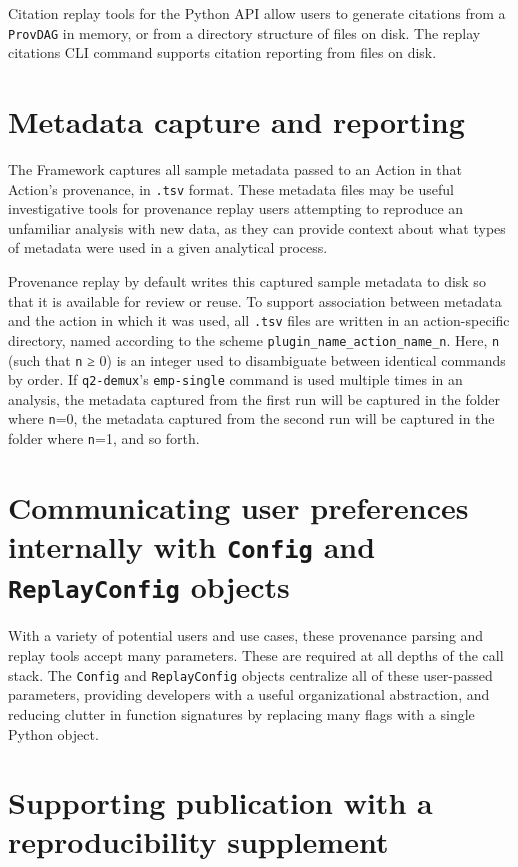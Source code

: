 Citation replay tools for the Python API allow users to generate citations from
a \texttt{ProvDAG} in memory, or from a directory structure of files on disk. The replay
citations CLI command supports citation reporting from files on disk.


\section{Metadata capture and reporting}

The Framework captures all sample metadata passed to an Action in that Action’s
provenance, in \texttt{.tsv} format. These metadata files may be useful investigative
tools for provenance replay users attempting to reproduce an unfamiliar analysis
with new data, as they can provide context about what types of metadata were
used in a given analytical process.

Provenance replay by default writes this captured sample metadata to disk so
that it is available for review or reuse. To support association between
metadata and the action in which it was used, all \texttt{.tsv} files are written in an
action-specific directory, named according to the scheme
\texttt{plugin\_name\_action\_name\_n}. Here, \texttt{n} (such that \texttt{n} ≥ 0) is an integer used to
disambiguate between identical commands by order. If \texttt{q2-demux}’s \texttt{emp-single}
command is used multiple times in an analysis, the metadata captured from the first
run will be captured in the folder where \texttt{n}=0, the metadata captured from the second
run will be captured in the folder where \texttt{n}=1, and so forth.


\section{Communicating user preferences internally with \texttt{Config} and \texttt{ReplayConfig} objects}

With a variety of potential users and use cases, these provenance parsing and
replay tools accept many parameters. These are required at all depths of the
call stack. The \texttt{Config} and \texttt{ReplayConfig} objects centralize all of these
user-passed parameters, providing developers with a useful organizational
abstraction, and reducing clutter in function signatures by replacing many flags
with a single Python object. 


\section{Supporting publication with a reproducibility supplement}

